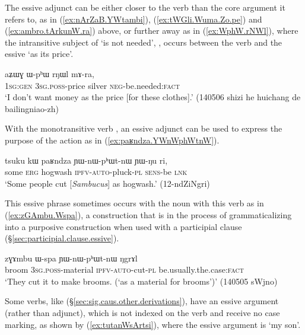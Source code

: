 The essive adjunct can be either closer to the verb than the core argument it refers to, as in (\ref{ex:nArZaB.YWtambi}), (\ref{ex:tWGli.Wuma.Zo.pe}) and (\ref{ex:ambro.tArkunW.ra}) above, or further away as in (\ref{ex:WphW.rNWl}), where the intransitive  subject of  `is not needed', , occurs between the verb and the essive  `as its price'.

\begin{exe}
\ex \label{ex:WphW.rNWl}
\gll  aʑɯɣ ɯ-pʰɯ rŋɯl mɤ-ra, \\
\textsc{1sg}:\textsc{gen} \textsc{3sg}.\textsc{poss}-price silver \textsc{neg}-be.needed:\textsc{fact} \\
\glt `I don't want money as the price [for these clothes].' (140506 shizi he huichang de bailingniao-zh) 
\end{exe}

With the monotransitive verb , an essive adjunct can be used to express the purpose of the action as in (\ref{ex:paʁndza.YWnWphWtnW}).  

\begin{exe}
\ex \label{ex:paʁndza.YWnWphWtnW} 
\gll tsuku kɯ paʁndza ɲɯ-nɯ-pʰɯt-nɯ ɲɯ-ŋu ri,  \\
some \textsc{erg} hogwash \textsc{ipfv}-\textsc{auto}-pluck-\textsc{pl} \textsc{sens}-be \textsc{lnk}   \\
\glt `Some people cut [\textit{Sambucus}] as hogwash.' (12-ndZiNgri)
\end{exe}

This essive phrase sometimes occurs with the noun  with this verb as in (\ref{ex:zGAmbu.Wspa}), a construction that is in the process of grammaticalizing into a purposive construction when used with a participial clause (§\ref{sec:participial.clause.essive}).  
 
\begin{exe}
\ex \label{ex:zGAmbu.Wspa}
\gll  zɣɤmbu ɯ-spa ɲɯ-nɯ-pʰɯt-nɯ ŋgrɤl  \\
broom \textsc{3sg}.\textsc{poss}-material \textsc{ipfv}-\textsc{auto}-cut-\textsc{pl} be.usually.the.case:\textsc{fact} \\
\glt `They cut it to make brooms. (`as a material for brooms')' (140505 sWjno) 
\end{exe}

Some verbs, like  (§\ref{sec:sig.caus.other.derivations}), have an essive argument (rather than adjunct), which is not indexed on the verb and receive no case marking, as shown by  (\ref{ex:tutanWsArtsi}), where the essive argument is  `my son'.

